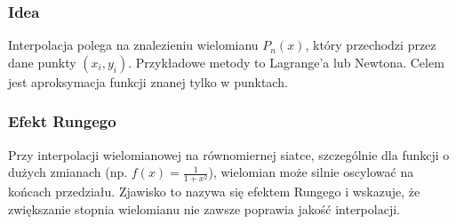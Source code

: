 \subsubsection*{Idea}
Interpolacja polega na znalezieniu wielomianu $P_n(x)$, który przechodzi przez dane punkty $(x_i, y_i)$. Przykładowe metody to Lagrange'a lub Newtona. Celem jest aproksymacja funkcji znanej tylko w punktach.

\subsubsection*{Efekt Rungego}
Przy interpolacji wielomianowej na równomiernej siatce, szczególnie dla funkcji o dużych zmianach (np. $f(x) = \frac{1}{1 + x^2}$), wielomian może silnie oscylować na końcach przedziału. Zjawisko to nazywa się efektem Rungego i wskazuje, że zwiększanie stopnia wielomianu nie zawsze poprawia jakość interpolacji.

